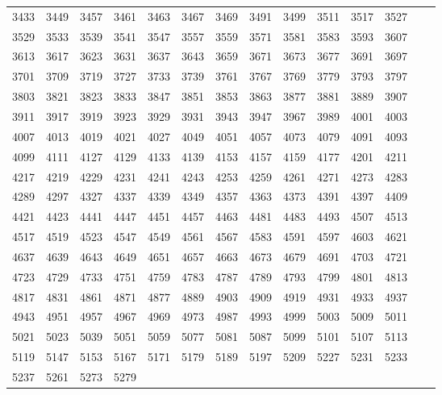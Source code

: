 \documentclass[10pt, a4paper]{article}
\begin{document}
\begin{center}
\begin{longtable}{c c c c c c c c c c c c c c}
        3433 & 3449 & 3457 & 3461 & 3463 & 3467 & 3469 & 3491 & 3499 & 3511 & 3517 & 3527 \\
        3529 & 3533 & 3539 & 3541 & 3547 & 3557 & 3559 & 3571 & 3581 & 3583 & 3593 & 3607 \\
        3613 & 3617 & 3623 & 3631 & 3637 & 3643 & 3659 & 3671 & 3673 & 3677 & 3691 & 3697 \\
        3701 & 3709 & 3719 & 3727 & 3733 & 3739 & 3761 & 3767 & 3769 & 3779 & 3793 & 3797 \\
        3803 & 3821 & 3823 & 3833 & 3847 & 3851 & 3853 & 3863 & 3877 & 3881 & 3889 & 3907 \\
        3911 & 3917 & 3919 & 3923 & 3929 & 3931 & 3943 & 3947 & 3967 & 3989 & 4001 & 4003 \\
        4007 & 4013 & 4019 & 4021 & 4027 & 4049 & 4051 & 4057 & 4073 & 4079 & 4091 & 4093 \\
        4099 & 4111 & 4127 & 4129 & 4133 & 4139 & 4153 & 4157 & 4159 & 4177 & 4201 & 4211 \\
        4217 & 4219 & 4229 & 4231 & 4241 & 4243 & 4253 & 4259 & 4261 & 4271 & 4273 & 4283 \\
        4289 & 4297 & 4327 & 4337 & 4339 & 4349 & 4357 & 4363 & 4373 & 4391 & 4397 & 4409 \\
        4421 & 4423 & 4441 & 4447 & 4451 & 4457 & 4463 & 4481 & 4483 & 4493 & 4507 & 4513 \\
        4517 & 4519 & 4523 & 4547 & 4549 & 4561 & 4567 & 4583 & 4591 & 4597 & 4603 & 4621 \\
        4637 & 4639 & 4643 & 4649 & 4651 & 4657 & 4663 & 4673 & 4679 & 4691 & 4703 & 4721 \\
        4723 & 4729 & 4733 & 4751 & 4759 & 4783 & 4787 & 4789 & 4793 & 4799 & 4801 & 4813 \\
        4817 & 4831 & 4861 & 4871 & 4877 & 4889 & 4903 & 4909 & 4919 & 4931 & 4933 & 4937 \\
        4943 & 4951 & 4957 & 4967 & 4969 & 4973 & 4987 & 4993 & 4999 & 5003 & 5009 & 5011 \\
        5021 & 5023 & 5039 & 5051 & 5059 & 5077 & 5081 & 5087 & 5099 & 5101 & 5107 & 5113 \\
        5119 & 5147 & 5153 & 5167 & 5171 & 5179 & 5189 & 5197 & 5209 & 5227 & 5231 & 5233 \\
        5237 & 5261 & 5273 & 5279 &     \hline
    \end{longtable}
\end{center}
\end{document}

